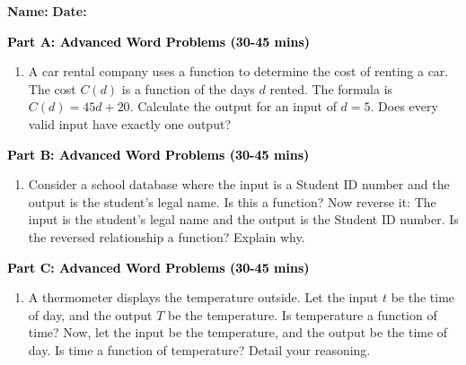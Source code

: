 \documentclass[12pt, letterpaper, fleqn]{article}
\begin{document}
\textbf{Name:} \underline{\hspace{5cm}}
\hfill
\textbf{Date:} \underline{\hspace{3cm}}\\


\begin{tcolorbox}[colback=customteal!20]
\large\textcolor{black}{\textbf{Part A: Advanced Word Problems (30-45 mins)}}
\end{tcolorbox}

\vspace{3mm}

\begin{enumerate}[itemsep=5.5cm, leftmargin=0.6cm]
\item A car rental company uses a function to determine the cost of renting a car. The cost $C(d)$ is a function of the days $d$ rented. The formula is $C(d) = 45d + 20$. Calculate the output for an input of $d = 5$. Does every valid input have exactly one output?
\end{enumerate}

\newpage

\begin{tcolorbox}[colback=customteal!20]
\large\textcolor{black}{\textbf{Part B: Advanced Word Problems (30-45 mins)}}
\end{tcolorbox}

\vspace{3mm}

\begin{enumerate}[itemsep=5.5cm, leftmargin=0.6cm, resume]
\item Consider a school database where the input is a Student ID number and the output is the student's legal name. Is this a function? Now reverse it: The input is the student's legal name and the output is the Student ID number. Is the reversed relationship a function? Explain why.
\end{enumerate}

\newpage

\begin{tcolorbox}[colback=customteal!20]
\large\textcolor{black}{\textbf{Part C: Advanced Word Problems (30-45 mins)}}
\end{tcolorbox}

\vspace{3mm}

\begin{enumerate}[itemsep=5.5cm, leftmargin=0.6cm, resume]
\item A thermometer displays the temperature outside. Let the input $t$ be the time of day, and the output $T$ be the temperature. Is temperature a function of time? Now, let the input be the temperature, and the output be the time of day. Is time a function of temperature? Detail your reasoning.
\end{enumerate}
\end{document}
